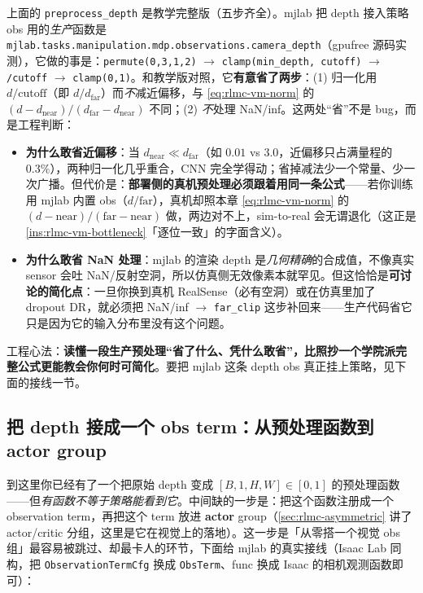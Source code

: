 \begin{note}
上面的 \verb|preprocess_depth| 是教学完整版（五步齐全）。mjlab 把 depth 接入策略 obs 用的\emph{生产}函数是 \verb|mjlab.tasks.manipulation.mdp.observations.camera_depth|（gpufree 源码实测），它做的事是：\verb|permute(0,3,1,2)| $\to$ \verb|clamp(min_depth, cutoff)| $\to$ \verb|/cutoff| $\to$ \verb|clamp(0,1)|。和教学版对照，它\textbf{有意省了两步}：(1) 归一化用 $d/\text{cutoff}$（即 $d/d_{\text{far}}$）而\emph{不}减近偏移，与 \eqref{eq:rlmc-vm-norm} 的 $(d-d_{\text{near}})/(d_{\text{far}}-d_{\text{near}})$ 不同；(2) \emph{不}处理 NaN/inf。这两处“省”不是 bug，而是工程判断：
\begin{itemize}
\item \textbf{为什么敢省近偏移}：当 $d_{\text{near}}\ll d_{\text{far}}$（如 $0.01$ vs $3.0$，近偏移只占满量程的 $0.3\%$），两种归一化几乎重合，CNN 完全学得动；省掉减法少一个常量、少一次广播。但代价是：\textbf{部署侧的真机预处理必须跟着用同一条公式}——若你训练用 mjlab 内置 obs（$d/\text{far}$），真机却照本章 \eqref{eq:rlmc-vm-norm} 的 $(d-\text{near})/(\text{far}-\text{near})$ 做，两边对不上，sim-to-real 会无谓退化（这正是 \cref{ins:rlmc-vm-bottleneck}「逐位一致」的字面含义）。
\item \textbf{为什么敢省 NaN 处理}：mjlab 的渲染 depth 是\emph{几何精确}的合成值，不像真实 sensor 会吐 NaN/反射空洞，所以仿真侧无效像素本就罕见。但这恰恰是\textbf{可讨论的简化点}：一旦你换到真机 RealSense（必有空洞）或在仿真里加了 dropout DR，就必须把 NaN/inf $\to$ \verb|far_clip| 这步补回来——生产代码省它只是因为它的输入分布里没有这个问题。
\end{itemize}
工程心法：\textbf{读懂一段生产预处理“省了什么、凭什么敢省”，比照抄一个学院派完整公式更能教会你何时可简化}。要把 mjlab 这条 depth obs 真正挂上策略，见下面的接线一节。
\end{note}

\subsection{把 depth 接成一个 obs term：从预处理函数到 actor group}
\label{sec:rlmc-vm-wire}

到这里你已经有了一个把原始 depth 变成 $[B,1,H,W]\in[0,1]$ 的预处理函数——但\emph{有函数不等于策略能看到它}。中间缺的一步是：把这个函数注册成一个 observation term，再把这个 term 放进 \textbf{actor} group（\cref{sec:rlmc-asymmetric} 讲了 actor/critic 分组，这里是它在视觉上的落地）。这一步是「从零搭一个视觉 obs 组」最容易被跳过、却最卡人的环节，下面给 mjlab 的真实接线（Isaac Lab 同构，把 \verb|ObservationTermCfg| 换成 \verb|ObsTerm|、func 换成 Isaac 的相机观测函数即可）：

